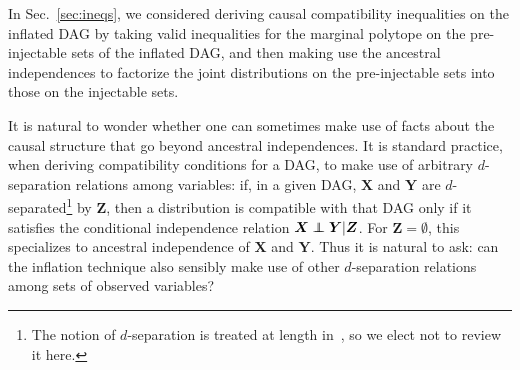 {In Sec.~\ref{sec:ineqs}, we considered deriving causal compatibility inequalities on the inflated DAG by taking valid inequalities for the marginal polytope on the pre-injectable sets of the inflated DAG, and then making use the ancestral independences to factorize the joint distributions on the pre-injectable sets into those on the injectable sets.

It is natural to wonder whether one can sometimes make use of facts about the causal structure that go beyond ancestral independences.  It is standard practice, when deriving compatibility conditions for a DAG, to make use of arbitrary $d$-separation relations among variables: if, in a given DAG, $\bm{X}$ and $\bm{Y}$ are $d$-separated\footnote{The notion of $d$-separation is treated at length in~\cite{pearl2009causality,studeny2005probabilistic,WoodSpekkens,pusey2014gdag}, so we elect not to review it here.} by $\bm{Z}$, then a distribution is compatible with that DAG only if it satisfies the conditional independence relation $\bm{X}\perp\!\!\!\!\perp\bm{Y}|\bm{Z}$. For $\bm{Z} = \emptyset$, this specializes to ancestral independence of $\bm{X}$ and $\bm{Y}$. Thus it is natural to ask: can the inflation technique also sensibly make use of other $d$-separation relations among sets of observed variables?



}

